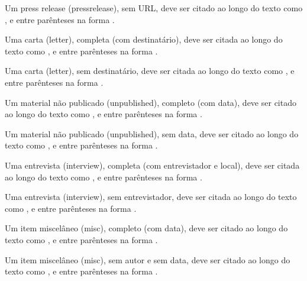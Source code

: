 \documentclass[a4paper,12pt]{article}
\begin{document}
Um press release (pressrelease), sem URL, deve ser citado ao longo do texto como \citet{press-2-missing-url}, e entre parênteses na forma \citep{press-2-missing-url}.


Uma carta (letter), completa (com destinatário), deve ser citada ao longo do texto como \citet{letter-1-complete}, e entre parênteses na forma \citep{letter-1-complete}.


Uma carta (letter), sem destinatário, deve ser citada ao longo do texto como \citet{letter-2-missing-recipient}, e entre parênteses na forma \citep{letter-2-missing-recipient}.


Um material não publicado (unpublished), completo (com data), deve ser citado ao longo do texto como \citet{unpub-1-complete}, e entre parênteses na forma \citep{unpub-1-complete}.


Um material não publicado (unpublished), sem data, deve ser citado ao longo do texto como \citet{unpub-2-missing-date}, e entre parênteses na forma \citep{unpub-2-missing-date}.


Uma entrevista (interview), completa (com entrevistador e local), deve ser citada ao longo do texto como \citet{interv-1-complete}, e entre parênteses na forma \citep{interv-1-complete}.


Uma entrevista (interview), sem entrevistador, deve ser citada ao longo do texto como \citet{interv-2-missing-interviewer}, e entre parênteses na forma \citep{interv-2-missing-interviewer}.


Um item miscelâneo (misc), completo (com data), deve ser citado ao longo do texto como \citet{misc-1-complete}, e entre parênteses na forma \citep{misc-1-complete}.


Um item miscelâneo (misc), sem autor e sem data, deve ser citado ao longo do texto como \citet{misc-2-missing-author-date}, e entre parênteses na forma \citep{misc-2-missing-author-date}.


\printbibliography[title={Referências}]
\end{document}
